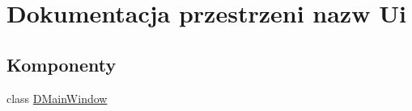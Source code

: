 \hypertarget{namespace_ui}{\section{Dokumentacja przestrzeni nazw Ui}
\label{namespace_ui}
}
\subsection*{Komponenty}
\begin{DoxyCompactItemize}
\item 
class \hyperlink{class_ui_1_1_d_main_window}{D\-Main\-Window}
\end{DoxyCompactItemize}
